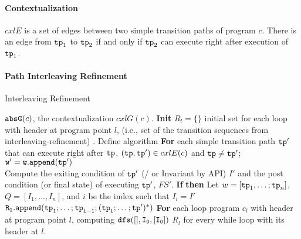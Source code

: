 \paragraph{Contextualization}

$cxlE$ is a set of edges between two simple transition paths of program $c$. There is an edge from $\mathtt{tp}_1$ to $\mathtt{tp}_2$
if and only if $\mathtt{tp}_2$ can execute right after execution of $\mathtt{tp}_1$.

\paragraph{Path Interleaving Refinement}
\begin{algorithm}
  \caption{
  {Interleaving Refinement}
  \label{alg:prog-refine}
  }
  \begin{algorithmic}[1]
  \REQUIRE $\mathtt{abs}{\mathtt{G}}(c)$, the contextualization $cxlG(c)$.
  \STATE  \textbf{Init} 
  $R_l = \{\}$ initial set for each loop with header at program point $l$, (i.e., set of the transition sequences from interleaving-refinement) .
  \STATE Define algorithm 
  \STATE {}
  \STATE \quad \textbf{For} each simple transition path $\mathtt{tp}'$ that can execute right after $\mathtt{tp}$,
  $(\mathtt{tp}, \mathtt{tp}') \in cxlE(c)$ and $\mathtt{tp} \neq \mathtt{tp}'$;
  \\
  \STATE \quad \quad $\mathtt{w' = w.append(\mathtt{tp}')}$
  \\
  \quad \quad {}
  \STATE  \quad \quad Compute the exiting condition of $\mathtt{tp}'$ (/ or Invariant by  API) $I'$ and the 
  post condition (or final state) of executing $\mathtt{tp}'$, $FS'$.
  \STATE \quad \quad \textbf{If} 
  \STATE \quad \quad \textbf{then}
  Let $w = [\mathtt{tp}_1, \ldots; \mathtt{tp}_n]$, $Q = [I_1, \ldots, I_n]$, and $i$ be the index such that $I_i = I'$
  \\ \quad \quad \quad \quad \quad
  $\mathtt{R_l.append(\mathtt{tp}_1; \ldots; \mathtt{tp}_{i - 1}; (\mathtt{tp}_i; \ldots; \mathtt{tp}')^*)}$
  \STATE \quad \quad  {}
  \STATE \textbf{For} each loop program $c_{l}$ with header at program point $l$, 
  \STATE \quad {}
  \STATE \quad computing $\mathtt{dfs([], I_0, [I_0] )}$
  \RETURN $R_l$ for every while loop with its header at $l$.
  \end{algorithmic}
  \end{algorithm}

